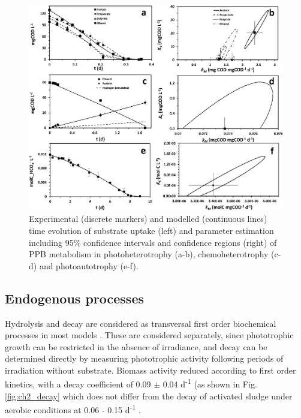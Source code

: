 \begin{figure}[H]
    \hspace*{0cm} 
    \includegraphics[width=\linewidth]{./Chap2/simulations/batch_tests.jpg}
    \caption{Experimental (discrete markers) and modelled (continuous lines) time evolution of substrate uptake (left) and parameter estimation including 95\% confidence intervals and confidence regions (right) of PPB metabolism in photoheterotrophy (a-b), chemoheterotrophy (c-d) and photoautotrophy (e-f).}
    \label{fig:ch2_batch_tests}
\end{figure}



\subsection{Endogenous processes}
Hydrolysis and decay are considered as transversal first order biochemical processes in most models \cite{batstone2006, henze2000, szilvester2010}. These are considered separately, since phototrophic growth can be restricted in the absence of irradiance, and decay can be determined directly by measuring phototrophic activity following periods of irradiation without substrate. Biomass activity reduced according to first order kinetics, with a decay coefficient of \num{0.09} $\pm$ \num{0.04} d\textsuperscript{-1} (as shown in Fig. \ref{fig:ch2_decay} which does not differ from the decay of activated sludge under aerobic conditions at \num{0.06} - \num{0.15} d\textsuperscript{-1} \cite{ezechi2015}. 

